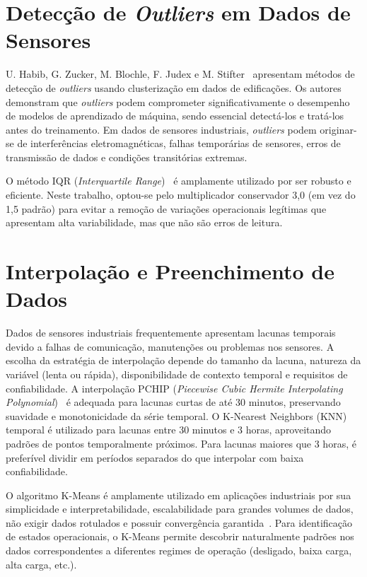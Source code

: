 \section{Detecção de \textit{Outliers} em Dados de Sensores}

U. Habib, G. Zucker, M. Blochle, F. Judex e M. Stifter~\cite{habib2015outliers} apresentam métodos de detecção de \textit{outliers} usando clusterização em dados de edificações. Os autores demonstram que \textit{outliers} podem comprometer significativamente o desempenho de modelos de aprendizado de máquina, sendo essencial detectá-los e tratá-los antes do treinamento. Em dados de sensores industriais, \textit{outliers} podem originar-se de interferências eletromagnéticas, falhas temporárias de sensores, erros de transmissão de dados e condições transitórias extremas.

O método IQR (\textit{Interquartile Range})~\cite{tukey1977iqr} é amplamente utilizado por ser robusto e eficiente. Neste trabalho, optou-se pelo multiplicador conservador 3,0 (em vez do 1,5 padrão) para evitar a remoção de variações operacionais legítimas que apresentam alta variabilidade, mas que não são erros de leitura.

\section{Interpolação e Preenchimento de Dados}

Dados de sensores industriais frequentemente apresentam lacunas temporais devido a falhas de comunicação, manutenções ou problemas nos sensores. A escolha da estratégia de interpolação depende do tamanho da lacuna, natureza da variável (lenta ou rápida), disponibilidade de contexto temporal e requisitos de confiabilidade. A interpolação PCHIP (\textit{Piecewise Cubic Hermite Interpolating Polynomial})~\cite{fritsch1980pchip} é adequada para lacunas curtas de até 30 minutos, preservando suavidade e monotonicidade da série temporal. O K-Nearest Neighbors (KNN) temporal é utilizado para lacunas entre 30 minutos e 3 horas, aproveitando padrões de pontos temporalmente próximos. Para lacunas maiores que 3 horas, é preferível dividir em períodos separados do que interpolar com baixa confiabilidade.

O algoritmo K-Means é amplamente utilizado em aplicações industriais por sua simplicidade e interpretabilidade, escalabilidade para grandes volumes de dados, não exigir dados rotulados e possuir convergência garantida~\cite{macqueen1967some}. Para identificação de estados operacionais, o K-Means permite descobrir naturalmente padrões nos dados correspondentes a diferentes regimes de operação (desligado, baixa carga, alta carga, etc.).

